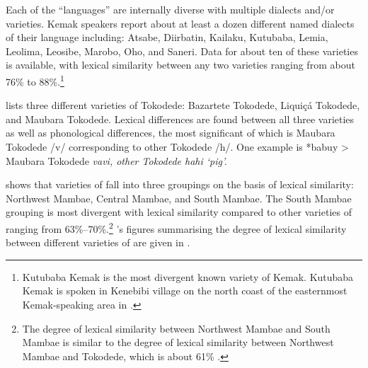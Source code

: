 
Each of the  “languages” are internally diverse
with multiple dialects and/or varieties.
Kemak speakers report about at least a dozen different named
dialects of their language including: Atsabe,
Diirbatin, Kailaku, Kutubaba, Lemia,
Leolima, Leosibe, Marobo, Oho, and Saneri.
Data for about ten of these varieties is available,
with lexical similarity between any two varieties ranging from
about 76{\%} to 88{\%}.\footnote{
		Kutubaba Kemak is
		the most divergent known variety of Kemak.
		Kutubaba Kemak is spoken in Kenebibi village on the north coast
		of the easternmost Kemak-speaking area in .}

\citet[i]{LSG2006} lists three different varieties of Tokodede:
Bazartete Tokodede, Liquiçá Tokodede, and Maubara Tokodede.
Lexical differences are found between all three varieties as
well as phonological differences,
the most significant of which is Maubara Tokodede /v/ corresponding
to other Tokodede /h/.
One example is *babuy > Maubara Tokodede \it{vavi}, other Tokodede \it{hahi} ‘pig’.

\citet{Fogaca2017} shows that varieties of  fall
into three groupings on the basis of lexical similarity: Northwest
Mambae, Central Mambae, and South Mambae.
The South Mambae grouping is most divergent with lexical similarity
compared to other varieties of  ranging from 63{\%}--70{\%}.\footnote{
		The degree of lexical similarity between Northwest Mambae
		and South Mambae is similar to the degree of lexical similarity
		between Northwest Mambae and Tokodede, which is about 61{\%} \citep[35]{Edwards2019}.}
\citeauthor{Fogaca2017}’s figures summarising the degree of lexical similarity
between different varieties of  are given in .


